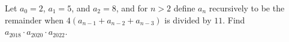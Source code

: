 Let $a_0 = 2$,  $a_1 = 5$,  and $a_2 = 8$,  and for $n>2$ define $a_n$ recursively to be the remainder when $4(a_{n-1} + a_{n-2} + a_{n-3})$ is divided by $11$.  Find $a_{2018}\cdot a_{2020}\cdot a_{2022}$.